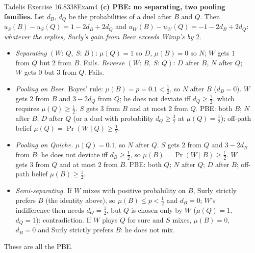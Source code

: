 \begin{exsol}{Tadelis Exercise 16.8}{338}{Exam}{4}
\textbf{(c) PBE: no separating, two pooling families.} Let $d_B$, $d_Q$ be the probabilities of a duel
after $B$ and $Q$. Then $u_S(B) - u_S(Q) = 1 - 2d_B + 2d_Q$ and $u_W(B) - u_W(Q) = -1 - 2d_B + 2d_Q$:
\emph{whatever the replies, Surly's gain from Beer exceeds Wimp's by $2$.}
\begin{itemize}
  \item \emph{Separating} $(W{:}\,Q,\ S{:}\,B)$: $\mu(Q) = 1$ so $D$, $\mu(B) = 0$ so $N$; $W$ gets $1$ from
  $Q$ but $2$ from $B$. Fails. \emph{Reverse} $(W{:}\,B,\ S{:}\,Q)$: $D$ after $B$, $N$ after $Q$; $W$ gets
  $0$ but $3$ from $Q$. Fails.
  \item \emph{Pooling on Beer.} Bayes' rule: $\mu(B) = p = 0.1 < \frac12$, so $N$ after $B$ ($d_B = 0$).
  $W$ gets $2$ from $B$ and $3 - 2d_Q$ from $Q$; he does not deviate iff $d_Q \ge \frac12$, which
  requires $\mu(Q) \ge \frac12$. $S$ gets $3$ from $B$ and at most $2$ from $Q$. PBE: both $B$; $N$
  after $B$; $D$ after $Q$ (or a duel with probability $d_Q \ge \frac12$ at $\mu(Q) = \frac12$); off-path belief
  $\mu(Q) = \Pr(W \mid Q) \ge \frac12$.
  \item \emph{Pooling on Quiche.} $\mu(Q) = 0.1$, so $N$ after $Q$. $S$ gets $2$ from $Q$ and $3 - 2d_B$
  from $B$: he does not deviate iff $d_B \ge \frac12$, so $\mu(B) = \Pr(W \mid B) \ge \frac12$. $W$ gets
  $3$ from $Q$ and at most $2$ from $B$. PBE: both $Q$; $N$ after $Q$; $D$ after $B$; off-path belief
  $\mu(B) \ge \frac12$.
  \item \emph{Semi-separating.} If $W$ mixes with positive probability on $B$, Surly strictly prefers
  $B$ (the identity above), so $\mu(B) \le p < \frac12$ and $d_B = 0$; $W$'s indifference then needs
  $d_Q = \frac12$, but $Q$ is chosen only by $W$ ($\mu(Q) = 1$, $d_Q = 1$): contradiction. If $W$ plays $Q$ for
  sure and $S$ mixes, $\mu(B) = 0$, $d_B = 0$ and Surly strictly prefers $B$: he does not mix.
\end{itemize}
These are all the PBE.


\end{exsol}
